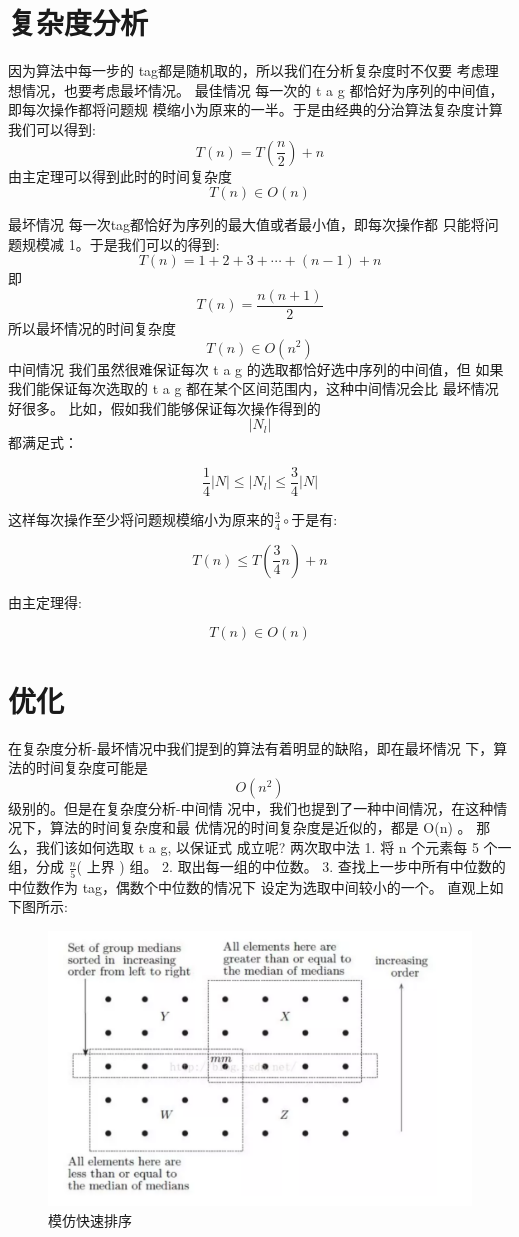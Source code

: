 \section{复杂度分析}
因为算法中每一步的 tag都是随机取的，所以我们在分析复杂度时不仅要 考虑理想情况，也要考虑最坏情况。
最佳情况  \quad  每一次的  t a g  都恰好为序列的中间值，即每次操作都将问题规 模缩小为原来的一半。于是由经典的分治算法复杂度计算我们可以得到:
$$T(n)=T\left(\frac{n}{2}\right)+n$$
由主定理可以得到此时的时间复杂度
$$T(n) \in O(n)$$

最坏情况 每一次tag都恰好为序列的最大值或者最小值，即每次操作都 只能将问题规模减 1。于是我们可以的得到:
$$
T(n)=1+2+3+\cdots+(n-1)+n
$$
即
$$
T(n)=\frac{n(n+1)}{2}
$$
所以最坏情况的时间复杂度
$$
T(n) \in O\left(n^{2}\right)
$$
中间情况  \quad  我们虽然很难保证每次  t a g  的选取都恰好选中序列的中间值，但
如果我们能保证每次选取的  t a g  都在某个区间范围内，这种中间情况会比 最坏情况好很多。
比如，假如我们能够保证每次操作得到的  
$$\left|N_{l}\right|  $$
都满足式：

$$\frac{1}{4}|N| \leq\left|N_{l}\right| \leq \frac{3}{4}|N|$$

这样每次操作至少将问题规模缩小为原来的$\frac{3}{4}\circ$于是有:

$$T(n) \leq T\left(\frac{3}{4} n\right)+n$$

由主定理得:

$$T(n) \in O(n)$$

\section{优化}
在复杂度分析-最坏情况中我们提到的算法有着明显的缺陷，即在最坏情况 下，算法的时间复杂度可能是 
$$O\left(n^{2}\right)$$
级别的。但是在复杂度分析-中间情 况中，我们也提到了一种中间情况，在这种情况下，算法的时间复杂度和最 优情况的时间复杂度是近似的，都是  O(n)  。
那么，我们该如何选取  t a g,  以保证式 成立呢?
两次取中法
1. 将 $ \mathrm{n}$  个元素每 5 个一组，分成  $\frac{n}{5}$(  上界  )  组。
2. 取出每一组的中位数。
3. 查找上一步中所有中位数的中位数作为 tag，偶数个中位数的情况下 设定为选取中间较小的一个。
直观上如下图所示:
\begin{figure}[htb]
	\centering
	\includegraphics[scale=0.5]{image/kth2.png}
  \caption{模仿快速排序}\label{fig:nearestpoints-divide}
\end{figure}

